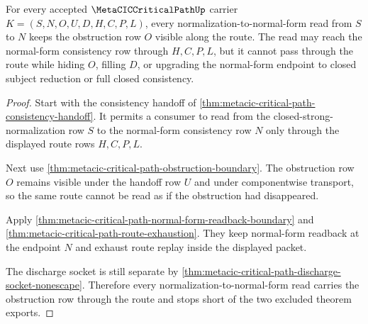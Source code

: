 \begin{theorem}
\label{thm:metacic-critical-path-normalization-obstruction-route-coverage}
For every accepted $\MetaCICCriticalPathUp$ carrier $K=(S,N,O,U,D,H,C,P,L)$, every normalization-to-normal-form read from $S$ to $N$ keeps the obstruction row $O$ visible along the route. The read may reach the normal-form consistency row through $H,C,P,L$, but it cannot pass through the route while hiding $O$, filling $D$, or upgrading the normal-form endpoint to closed subject reduction or full closed consistency.
\end{theorem}
\begin{proof}
Start with the consistency handoff of \autoref{thm:metacic-critical-path-consistency-handoff}. It permits a consumer to read from the closed-strong-normalization row $S$ to the normal-form consistency row $N$ only through the displayed route rows $H,C,P,L$.

Next use \autoref{thm:metacic-critical-path-obstruction-boundary}. The obstruction row $O$ remains visible under the handoff row $U$ and under componentwise transport, so the same route cannot be read as if the obstruction had disappeared.

Apply \autoref{thm:metacic-critical-path-normal-form-readback-boundary} and \autoref{thm:metacic-critical-path-route-exhaustion}. They keep normal-form readback at the endpoint $N$ and exhaust route replay inside the displayed packet.

The discharge socket is still separate by \autoref{thm:metacic-critical-path-discharge-socket-nonescape}. Therefore every normalization-to-normal-form read carries the obstruction row through the route and stops short of the two excluded theorem exports.
\end{proof}

